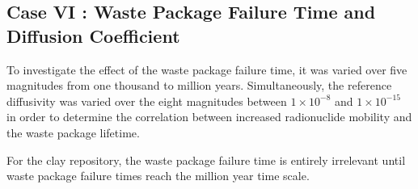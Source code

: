 
\subsection{Case VI : Waste Package Failure Time and Diffusion Coefficient}

To investigate the effect of the waste package failure time, it was varied over 
five magnitudes from one thousand to million years. Simultaneously, the reference 
diffusivity was varied over the eight magnitudes between $1\times10^{-8}$ and 
$1\times10^{-15}$ in order to determine the correlation between increased 
radionuclide mobility and the waste package lifetime. 


For the clay repository, the waste package failure time is entirely irrelevant 
until waste package failure times reach the million year time scale. 

